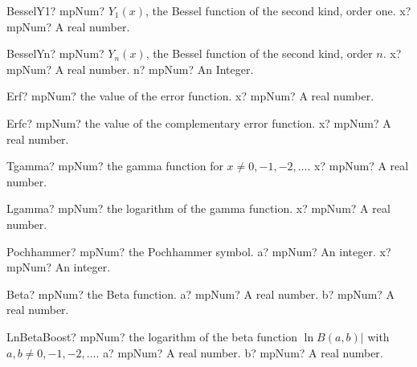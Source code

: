 \documentclass[12pt,a4paper,openany]{book}
\begin{document}
\begin{mpFunctionsExtract}
\mpFunctionOne
{BesselY1? mpNum? $Y_1(x)$, the Bessel function of the second kind, order one.}
{x? mpNum? A real number.}
\end{mpFunctionsExtract}

\begin{mpFunctionsExtract}
\mpFunctionTwo
{BesselYn? mpNum? $Y_n(x)$, the Bessel function of the second kind, order $n$.}
{x? mpNum? A real number.}
{n? mpNum? An Integer.}
\end{mpFunctionsExtract}

\begin{mpFunctionsExtract}
\mpFunctionOne
{Erf? mpNum? the value of the error function.}
{x? mpNum? A real number.}
\end{mpFunctionsExtract}

\begin{mpFunctionsExtract}
\mpFunctionOne
{Erfc? mpNum? the value of the complementary error function.}
{x? mpNum? A real number.}
\end{mpFunctionsExtract}

\begin{mpFunctionsExtract}
\mpFunctionOne
{Tgamma? mpNum? the gamma function for $x \neq 0, -1, -2,\ldots$.}
{x? mpNum? A real number.}
\end{mpFunctionsExtract}

\begin{mpFunctionsExtract}
\mpFunctionOne
{Lgamma? mpNum? the logarithm of the gamma function.}
{x? mpNum? A real number.}
\end{mpFunctionsExtract}

\begin{mpFunctionsExtract}
\mpFunctionTwo
{Pochhammer? mpNum? the Pochhammer symbol.}
{a? mpNum? An integer.}
{x? mpNum? An integer.}
\end{mpFunctionsExtract}

\begin{mpFunctionsExtract}
\mpFunctionTwo
{Beta? mpNum? the Beta function.}
{a? mpNum? A real number.}
{b? mpNum? A real number.}
\end{mpFunctionsExtract}

\begin{mpFunctionsExtract}
\mpFunctionTwo
{LnBetaBoost? mpNum? the logarithm of the beta function $\ln B(a,b)|$ with $a,b \neq 0,-1,-2,\ldots$.}
{a? mpNum? A real number.}
{b? mpNum? A real number.}
\end{mpFunctionsExtract}
\end{document}
